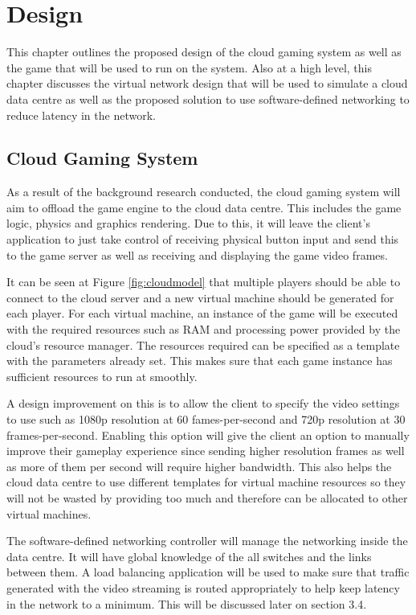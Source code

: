 \chapter{Design}
\label{chapter3}
This chapter outlines the proposed design of the cloud gaming system as well as the game that will be used to run on the system. Also at a high level, this chapter discusses the virtual network design that will be used to simulate a cloud data centre as well as the proposed solution to use software-defined networking to reduce latency in the network.

\section{Cloud Gaming System}
As a result of the background research conducted, the cloud gaming system will aim to offload the game engine to the cloud data centre. This includes the game logic, physics and graphics rendering. Due to this, it will leave the client's application to just take control of receiving physical button input and send this to the game server as well as receiving and displaying the game video frames.
\newline
\par
It can be seen at Figure \ref{fig:cloudmodel} that multiple players should be able to connect to the cloud server and a new virtual machine should be generated for each player. For each virtual machine, an instance of the game will be executed with the required resources such as RAM and processing power provided by the cloud's resource manager. The resources required can be specified as a template with the parameters already set. This makes sure that each game instance has sufficient resources to run at smoothly.
\newline
\par
A design improvement on this is to allow the client to specify the video settings to use such as 1080p resolution at 60 fames-per-second and 720p resolution at 30 frames-per-second. Enabling this option will give the client an option to manually improve their gameplay experience since sending higher resolution frames as well as more of them per second will require higher bandwidth. This also helps the cloud data centre to use different templates for virtual machine resources so they will not be wasted by providing too much and therefore can be allocated to other virtual machines.
\newline
\par
The software-defined networking controller will manage the networking inside the data centre. It will have global knowledge of the all switches and the links between them. A load balancing application will be used to make sure that traffic generated with the video streaming is routed appropriately to help keep latency in the network to a minimum. This will be discussed later on section 3.4.

